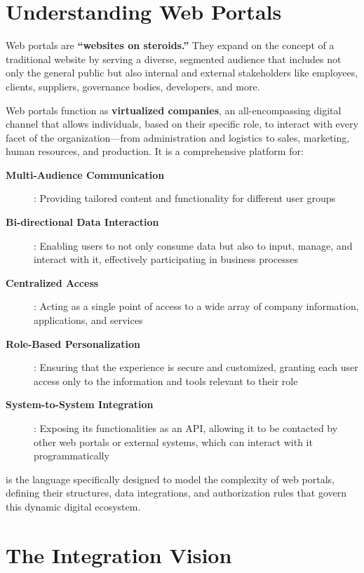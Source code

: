 \section{Understanding Web Portals}
\label{sec:web-portals}

Web portals are \textbf{``websites on steroids.''} They expand on the concept of a traditional website by serving a diverse, segmented audience that includes not only the general public but also internal and external stakeholders like employees, clients, suppliers, governance bodies, developers, and more.

Web portals function as \textbf{virtualized companies}, an all-encompassing digital channel that allows individuals, based on their specific role, to interact with every facet of the organization—from administration and logistics to sales, marketing, human resources, and production. It is a comprehensive platform for:

\begin{description}
\item[\textbf{Multi-Audience Communication}]: Providing tailored content and functionality for different user groups
\item[\textbf{Bi-directional Data Interaction}]: Enabling users to not only consume data but also to input, manage, and interact with it, effectively participating in business processes
\item[\textbf{Centralized Access}]: Acting as a single point of access to a wide array of company information, applications, and services
\item[\textbf{Role-Based Personalization}]: Ensuring that the experience is secure and customized, granting each user access only to the information and tools relevant to their role
\item[\textbf{System-to-System Integration}]: Exposing its functionalities as an API, allowing it to be contacted by other web portals or external systems, which can interact with it programmatically
\end{description}

\wbdl{} is the language specifically designed to model the complexity of web portals, defining their structures, data integrations, and authorization rules that govern this dynamic digital ecosystem.

\section{The Integration Vision}
\label{sec:integration-vision}

